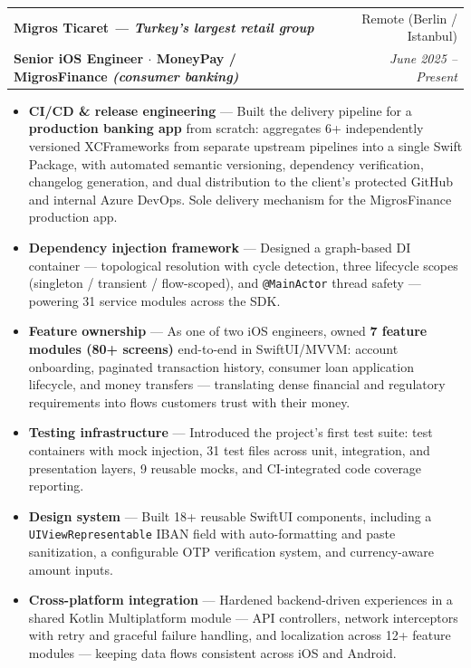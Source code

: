 \documentclass[a4paper,11pt]{article}
\makeatletter
\newcommand{\resumeItem}[2]{
  \item\small{
    \textbf{#1} --- #2\vspace{-2pt}
  }
}
\newcommand{\resumeSubheading}[4]{
  \vspace{2pt}\item
    \begin{tabular*}{0.97\textwidth}[t]{l@{\extracolsep{\fill}}r}
      \textbf{#1} & \small#2 \\
      \small\textbf{#3} & \textit{\small #4} \\
    \end{tabular*}\vspace{-5pt}
}
\newcommand{\resumeItemListStart}{\begin{itemize}}
\newcommand{\resumeItemListEnd}{\end{itemize}\vspace{-5pt}}
\makeatother
\begin{document}
    \resumeSubheading
      {Migros Ticaret \textnormal{\small\textit{--- Turkey's largest retail group}}}{Remote (Berlin / Istanbul)}
      {Senior iOS Engineer $\cdot$ MoneyPay / MigrosFinance \textnormal{\textit{(consumer banking)}}}{June 2025 -- Present}
      \resumeItemListStart
        \resumeItem{CI/CD \& release engineering}
          {Built the delivery pipeline for a \textbf{production banking app} from scratch: aggregates 6+ independently versioned XCFrameworks from separate upstream pipelines into a single Swift Package, with automated semantic versioning, dependency verification, changelog generation, and dual distribution to the client's protected GitHub and internal Azure DevOps. Sole delivery mechanism for the MigrosFinance production app.}
        \resumeItem{Dependency injection framework}
          {Designed a graph-based DI container --- topological resolution with cycle detection, three lifecycle scopes (singleton / transient / flow-scoped), and \texttt{@MainActor} thread safety --- powering 31 service modules across the SDK.}
        \resumeItem{Feature ownership}
          {As one of two iOS engineers, owned \textbf{7 feature modules (80+ screens)} end-to-end in SwiftUI/MVVM: account onboarding, paginated transaction history, consumer loan application lifecycle, and money transfers --- translating dense financial and regulatory requirements into flows customers trust with their money.}
        \resumeItem{Testing infrastructure}
          {Introduced the project's first test suite: test containers with mock injection, 31 test files across unit, integration, and presentation layers, 9 reusable mocks, and CI-integrated code coverage reporting.}
        \resumeItem{Design system}
          {Built 18+ reusable SwiftUI components, including a \texttt{UIViewRepresentable} IBAN field with auto-formatting and paste sanitization, a configurable OTP verification system, and currency-aware amount inputs.}
        \resumeItem{Cross-platform integration}
          {Hardened backend-driven experiences in a shared Kotlin Multiplatform module --- API controllers, network interceptors with retry and graceful failure handling, and localization across 12+ feature modules --- keeping data flows consistent across iOS and Android.}
      \resumeItemListEnd
\end{document}
